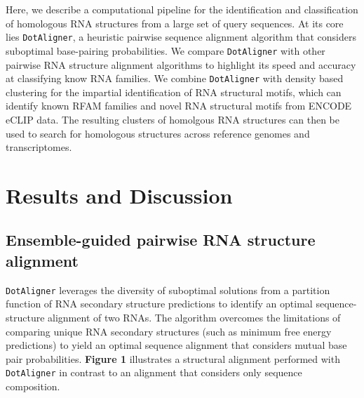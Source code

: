 \documentclass{bmcart}
\newcommand\dotaligner{\texttt{DotAligner}}
\newcommand\graphclust{\texttt{GraphClust}}
\newcommand\locarna{\texttt{LocaRNA}}
\newcommand\carna{\texttt{CARNA}}
\begin{document}


Here, we describe a computational pipeline for the identification and classification of
homologous RNA structures from a large set of query sequences. At its core lies \dotaligner{}, a
heuristic pairwise sequence alignment algorithm that considers suboptimal 
base-pairing probabilities. We compare \dotaligner{} with other pairwise RNA structure 
alignment algorithms to highlight its speed and accuracy at classifying know RNA families. 
We combine \dotaligner{} with density based clustering for the impartial identification of 
RNA structural motifs, which can identify known RFAM families and novel RNA structural 
motifs from ENCODE eCLIP data. The resulting clusters of homolgous RNA structures can then 
be used to search for homologous structures across reference genomes and transcriptomes.  

\section*{Results and Discussion}
\subsection*{Ensemble-guided pairwise RNA structure alignment} 
 
\dotaligner{} leverages the diversity of  suboptimal solutions from a partition function of RNA secondary structure predictions to identify an optimal sequence-structure alignment of two RNAs. 
The algorithm overcomes the limitations of comparing unique RNA 
secondary structures (such as minimum free energy predictions) to yield 
an optimal sequence alignment that considers mutual base pair probabilities.
\textbf{Figure 1} illustrates a structural alignment performed with \dotaligner{}
in contrast to an alignment that considers only sequence composition.\\
\end{document}
